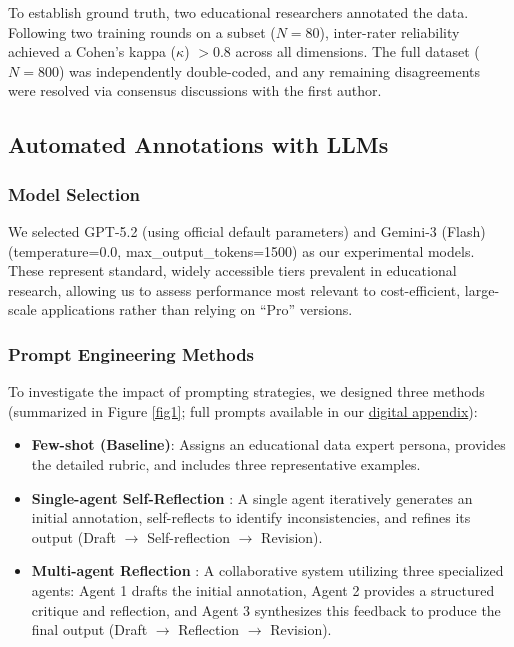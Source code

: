 \documentclass[runningheads]{llncs}
\begin{document}
To establish ground truth, two educational researchers annotated the data. Following two training rounds on a subset ($N=80$), inter-rater reliability achieved a Cohen’s kappa ($\kappa$) $> 0.8$ across all dimensions. The full dataset ($N=800$) was independently double-coded, and any remaining disagreements were resolved via consensus discussions with the first author.

\subsection{Automated Annotations with LLMs}
\subsubsection{Model Selection}
We selected GPT-5.2 (using official default parameters) and Gemini-3 (Flash) (temperature=0.0, max\_output\_tokens=1500) as our experimental models. These represent standard, widely accessible tiers prevalent in educational research, allowing us to assess performance most relevant to cost-efficient, large-scale applications rather than relying on ``Pro'' versions.

\subsubsection{Prompt Engineering Methods}
To investigate the impact of prompting strategies, we designed three methods (summarized in Figure \ref{fig1}; full prompts available in our \href{https://osf.io/yvhar/overview?view_only=eededcccd433490191439605dd9ebd79}{digital appendix}):
\begin{itemize}
    \item \textbf{Few-shot (Baseline)}: Assigns an educational data expert persona, provides the detailed rubric, and includes three representative examples.
    \item \textbf{Single-agent Self-Reflection} \cite{shinn2023reflexion}: A single agent iteratively generates an initial annotation, self-reflects to identify inconsistencies, and refines its output (Draft $\to$ Self-reflection $\to$ Revision).
    \item \textbf{Multi-agent Reflection} \cite{shinn2023reflexion,cao2025first}: A collaborative system utilizing three specialized agents: Agent 1 drafts the initial annotation, Agent 2 provides a structured critique and reflection, and Agent 3 synthesizes this feedback to produce the final output (Draft $\to$ Reflection $\to$ Revision).
\end{itemize}
\end{document}
